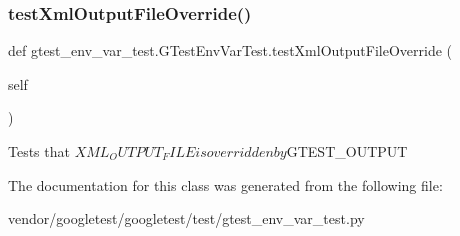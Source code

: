 \subsubsection{\texorpdfstring{test\+Xml\+Output\+File\+Override()}{testXmlOutputFileOverride()}}
{\footnotesize\ttfamily def gtest\+\_\+env\+\_\+var\+\_\+test.\+G\+Test\+Env\+Var\+Test.\+test\+Xml\+Output\+File\+Override (\begin{DoxyParamCaption}\item[{}]{self }\end{DoxyParamCaption})}

\begin{DoxyVerb}Tests that $XML_OUTPUT_FILE is overridden by $GTEST_OUTPUT\end{DoxyVerb}
 

The documentation for this class was generated from the following file\+:\begin{DoxyCompactItemize}
\item 
vendor/googletest/googletest/test/gtest\+\_\+env\+\_\+var\+\_\+test.\+py\end{DoxyCompactItemize}

